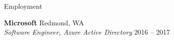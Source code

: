 \documentclass{resume} %
\begin{document}
\begin{grouping}{Employment}

\item {\bf Microsoft } \hfill Redmond, WA \\
    {\em Software Engineer, Azure Active Directory} \hfill 2016 -- 2017
\iffalse
\hspace*{3mm}- Refactored reporting features in Active Directory’s UI for performance and usability \\
\hspace*{3mm}- Updated the reporting service deployment system and deployed to sovereign clouds \\
\hspace*{3mm}- Maintained data pipeline that processed billions of events per month
\fi

\end{grouping}


\end{document}
